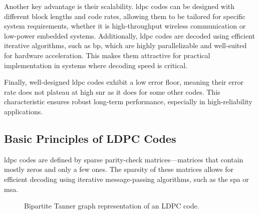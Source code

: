 \documentclass[../main.tex]{subfiles}
\begin{document}
Another key advantage is their scalability. 
\gls{ldpc} codes can be designed with different block lengths and code rates, allowing them to be tailored for specific system requirements, whether it is high-throughput wireless communication or low-power embedded systems. 
Additionally, \gls{ldpc} codes are decoded using efficient iterative algorithms, such as \gls{bp}, which are highly parallelizable and well-suited for hardware acceleration. This makes them attractive for practical implementation in systems where decoding speed is critical.

Finally, well-designed \gls{ldpc} codes exhibit a low error floor, meaning their error rate does not plateau at high \gls{snr} as it does for some other codes. This characteristic ensures robust long-term performance, especially in high-reliability applications.

\subsection{Basic Principles of LDPC Codes}
\gls{ldpc} codes are defined by sparse parity-check matrices—matrices that contain mostly zeros and only a few ones.
The sparsity of these matrices allows for efficient decoding using iterative message-passing algorithms, such as the \gls{spa} or \gls{msa}.

\begin{figure}[h!] 
    \centering
    \caption{Bipartite Tanner graph representation of an LDPC code.} 
    \label{fig:ldpc_tanner_graph}
\end{figure}
\end{document}
